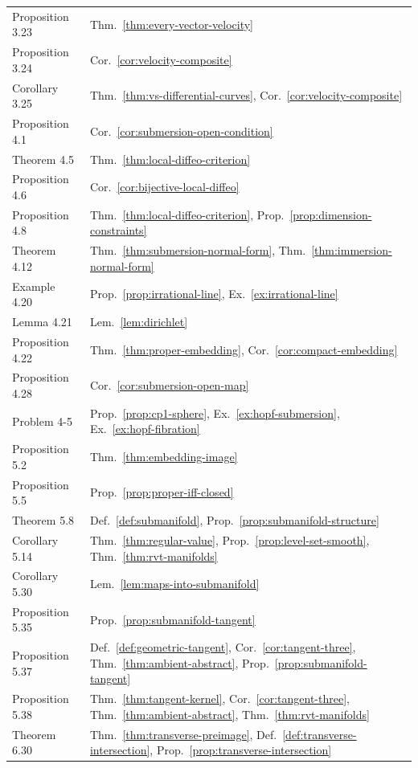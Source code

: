 \documentclass[11pt]{report}
\begin{document}
{\begin{longtable}{>{\raggedright\arraybackslash}p{3.6cm} >{\raggedright\arraybackslash}p{11.2cm}}
Proposition 3.23 & Thm.~\ref{thm:every-vector-velocity} \\
Proposition 3.24 & Cor.~\ref{cor:velocity-composite} \\
Corollary 3.25 & Thm.~\ref{thm:vs-differential-curves}, Cor.~\ref{cor:velocity-composite} \\
Proposition 4.1 & Cor.~\ref{cor:submersion-open-condition} \\
Theorem 4.5 & Thm.~\ref{thm:local-diffeo-criterion} \\
Proposition 4.6 & Cor.~\ref{cor:bijective-local-diffeo} \\
Proposition 4.8 & Thm.~\ref{thm:local-diffeo-criterion}, Prop.~\ref{prop:dimension-constraints} \\
Theorem 4.12 & Thm.~\ref{thm:submersion-normal-form}, Thm.~\ref{thm:immersion-normal-form} \\
Example 4.20 & Prop.~\ref{prop:irrational-line}, Ex.~\ref{ex:irrational-line} \\
Lemma 4.21 & Lem.~\ref{lem:dirichlet} \\
Proposition 4.22 & Thm.~\ref{thm:proper-embedding}, Cor.~\ref{cor:compact-embedding} \\
Proposition 4.28 & Cor.~\ref{cor:submersion-open-map} \\
Problem 4-5 & Prop.~\ref{prop:cp1-sphere}, Ex.~\ref{ex:hopf-submersion}, Ex.~\ref{ex:hopf-fibration} \\
Proposition 5.2 & Thm.~\ref{thm:embedding-image} \\
Proposition 5.5 & Prop.~\ref{prop:proper-iff-closed} \\
Theorem 5.8 & Def.~\ref{def:submanifold}, Prop.~\ref{prop:submanifold-structure} \\
Corollary 5.14 & Thm.~\ref{thm:regular-value}, Prop.~\ref{prop:level-set-smooth}, Thm.~\ref{thm:rvt-manifolds} \\
Corollary 5.30 & Lem.~\ref{lem:maps-into-submanifold} \\
Proposition 5.35 & Prop.~\ref{prop:submanifold-tangent} \\
Proposition 5.37 & Def.~\ref{def:geometric-tangent}, Cor.~\ref{cor:tangent-three}, Thm.~\ref{thm:ambient-abstract}, Prop.~\ref{prop:submanifold-tangent} \\
Proposition 5.38 & Thm.~\ref{thm:tangent-kernel}, Cor.~\ref{cor:tangent-three}, Thm.~\ref{thm:ambient-abstract}, Thm.~\ref{thm:rvt-manifolds} \\
Theorem 6.30 & Thm.~\ref{thm:transverse-preimage}, Def.~\ref{def:transverse-intersection}, Prop.~\ref{prop:transverse-intersection} \\

\end{longtable}}
\end{document}
